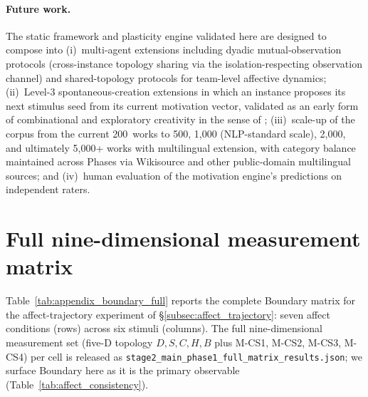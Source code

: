 \documentclass{article}
\begin{document}
\paragraph{Future work.} The static framework and plasticity engine validated
here are designed to compose into (i)~multi-agent extensions including
dyadic mutual-observation protocols (cross-instance topology sharing via
the isolation-respecting observation channel) and shared-topology protocols
for team-level affective dynamics; (ii)~Level-3 spontaneous-creation
extensions in which an instance proposes its next stimulus seed from its
current motivation vector, validated as an early form of combinational and
exploratory creativity in the sense of \cite{boden2004creative};
(iii)~scale-up of the corpus from the current 200~works to 500, 1{,}000
(NLP-standard scale), 2{,}000, and ultimately 5{,}000+ works with
multilingual extension, with category balance maintained across Phases via
Wikisource and other public-domain multilingual sources; and (iv)~human
evaluation of the motivation engine's predictions on independent raters.

\appendix

\section{Full nine-dimensional measurement matrix}
\label{app:fullmatrix}

Table~\ref{tab:appendix_boundary_full} reports the complete Boundary
matrix for the affect-trajectory experiment of
\S\ref{subsec:affect_trajectory}: seven affect conditions (rows) across
six stimuli (columns). The full nine-dimensional measurement set
(five-D topology $D, S, C, H, B$ plus M-CS1, M-CS2, M-CS3, M-CS4) per
cell is released as
\texttt{stage2\_main\_phase1\_full\_matrix\_results.json}; we surface
Boundary here as it is the primary observable
(Table~\ref{tab:affect_consistency}).
\end{document}
